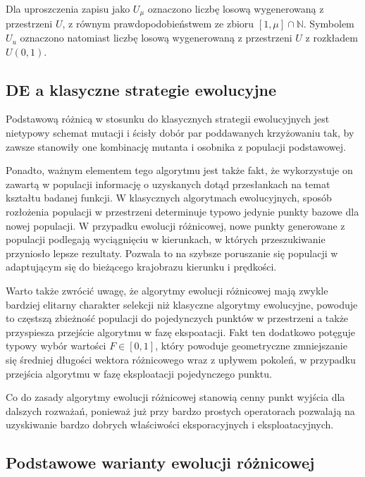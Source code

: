 \documentclass[12pt,a4paper]{report}
\begin{document}
{{{Dla uproszczenia zapisu jako $U_\mu$ oznaczono liczbę losową wygenerowaną z przestrzeni $U$, z równym prawdopodobieństwem ze zbioru $[1, \mu] \cap \mathbb{N}$. Symbolem $U_u$ oznaczono natomiast liczbę losową wygenerowaną z przestrzeni $U$ z rozkładem $U(0,1)$.
}

\subsection{DE a klasyczne strategie ewolucyjne}
\par{
Podstawową różnicą w stosunku do klasycznych strategii ewolucyjnych jest nietypowy schemat mutacji i ścisły dobór par poddawanych krzyżowaniu tak, by zawsze stanowiły one kombinację mutanta i osobnika z populacji  podstawowej.
}
\par{
Ponadto, ważnym elementem tego algorytmu jest także fakt, że wykorzystuje on zawartą w populacji informację o uzyskanych dotąd przesłankach na temat kształtu badanej funkcji. W klasycznych algorytmach ewolucyjnych, sposób rozłożenia populacji w przestrzeni determinuje typowo jedynie punkty bazowe dla nowej populacji. W przypadku ewolucji różnicowej, nowe punkty generowane z populacji podlegają wyciągnięciu w kierunkach, w których przeszukiwanie przyniosło lepsze rezultaty. Pozwala to na szybsze poruszanie się populacji w adaptującym się do bieżącego krajobrazu kierunku i prędkości.
}
\par{
Warto także zwrócić uwagę, że algorytmy ewolucji różnicowej mają zwykle bardziej elitarny charakter selekcji niż klasyczne algorytmy ewolucyjne, powoduje to częstszą zbieżność populacji do pojedynczych punktów w przestrzeni a także przyspiesza przejście algorytmu w fazę ekspoatacji. Fakt ten dodatkowo potęguje typowy wybór wartości $F \in [0, 1]$, który powoduje geometryczne zmniejszanie się średniej długości wektora różnicowego wraz z upływem pokoleń, w przypadku przejścia algorytmu w fazę eksploatacji pojedynczego punktu.
}
\par{
Co do zasady algorytmy ewolucji różnicowej stanowią cenny punkt wyjścia dla dalszych rozważań, ponieważ już przy bardzo prostych operatorach pozwalają na uzyskiwanie bardzo dobrych właściwości eksporacyjnych i eksploatacyjnych.
}

\subsection{Podstawowe warianty ewolucji różnicowej}
}}
\end{document}
